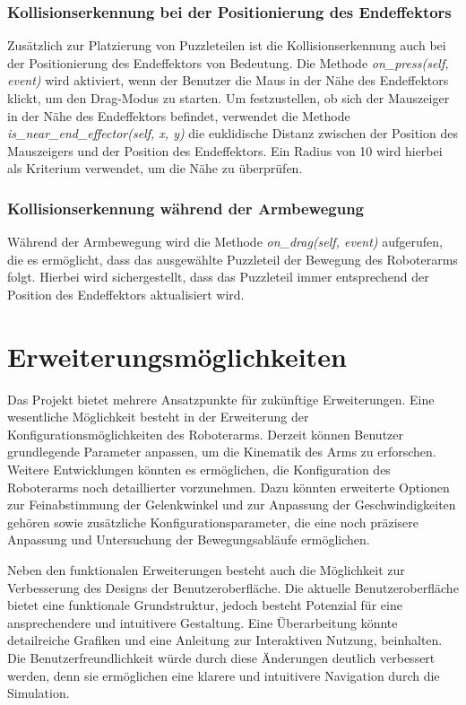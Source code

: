 \documentclass[12pt]{article}
\begin{document}
    \subsubsection{Kollisionserkennung bei der Positionierung des Endeffektors}
    Zusätzlich zur Platzierung von Puzzleteilen ist die Kollisionserkennung auch bei der Positionierung
    des Endeffektors von Bedeutung. Die Methode \textit{on\_press(self, event)} wird aktiviert, wenn der Benutzer
    die Maus in der Nähe des Endeffektors klickt, um den Drag-Modus zu starten. Um festzustellen, ob sich
    der Mauszeiger in der Nähe des Endeffektors befindet, verwendet die Methode
    \textit{is\_near\_end\_effector(self, x, y)} die euklidische Distanz zwischen der Position des Mauszeigers und
    der Position des Endeffektors. Ein Radius von 10 wird hierbei als Kriterium verwendet, um die Nähe
    zu überprüfen.

    \subsubsection{Kollisionserkennung während der Armbewegung}
    Während der Armbewegung wird die Methode \textit{on\_drag(self, event)} aufgerufen, die es ermöglicht, dass
    das ausgewählte Puzzleteil der Bewegung des Roboterarms folgt. Hierbei wird sichergestellt, dass das
    Puzzleteil immer entsprechend der Position des Endeffektors aktualisiert wird.


    \section{Erweiterungsmöglichkeiten}
    Das Projekt bietet mehrere Ansatzpunkte für zukünftige Erweiterungen. Eine wesentliche Möglichkeit besteht in
    der Erweiterung der Konfigurationsmöglichkeiten des Roboterarms. Derzeit können Benutzer grundlegende Parameter
    anpassen, um die Kinematik des Arms zu erforschen. Weitere Entwicklungen könnten es ermöglichen, die
    Konfiguration des Roboterarms noch detaillierter vorzunehmen. Dazu könnten erweiterte Optionen zur
    Feinabstimmung der Gelenkwinkel und zur Anpassung der Geschwindigkeiten gehören sowie zusätzliche
    Konfigurationsparameter, die eine noch präzisere Anpassung und Untersuchung der Bewegungsabläufe ermöglichen.

    Neben den funktionalen Erweiterungen besteht auch die Möglichkeit zur Verbesserung des Designs der
    Benutzeroberfläche. Die aktuelle Benutzeroberfläche bietet eine funktionale Grundstruktur, jedoch besteht
    Potenzial für eine ansprechendere und intuitivere Gestaltung. Eine Überarbeitung könnte detailreiche Grafiken
    und eine Anleitung zur Interaktiven Nutzung, beinhalten. Die Benutzerfreundlichkeit würde durch diese
    Änderungen deutlich verbessert werden, denn sie ermöglichen eine klarere und intuitivere Navigation
    durch die Simulation.
\end{document}
